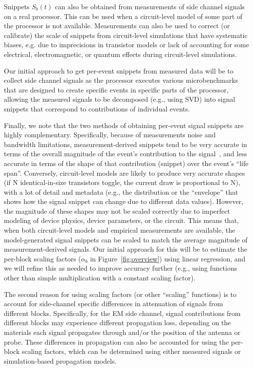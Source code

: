 Snippets $S_b(t)$ can also be obtained from measurements of side channel signals on a real processor. This can be used when a circuit-level model of some part of the processor is not available. Measurements can also be used to correct (or calibrate) the scale of snippets from circuit-level simulations that have systematic biases, e.g. due to imprecisions in transistor models or lack of accounting for some electrical, electromagnetic, or quantum effects during circuit-level simulations.

Our initial approach to get per-event snippets from measured data will be to collect side channel signals as the processor executes various microbenchmarks that are designed to create specific events in specific parts of the processor, allowing the measured signals to be decomposed (e.g., using SVD) into signal snippets that correspond to contributions of individual events.

Finally, we note that the two methods of obtaining per-event signal snippets are highly complementary. Specifically, because of measurements noise and bandwidth limitations, measurement-derived snippets tend to be very accurate in terms of the overall magnitude of the event's contribution to the signal~\cite{Callan:2014:PMM:2742155.2742179}, and less accurate in terms of the shape of that contribution (snippet) over the event's ``life span''. Conversely, circuit-level models are likely to produce very accurate shapes (if N identical-in-size transistors toggle, the current draw is proportional to N), with a lot of detail and metadata (e.g., the distribution or the ``envelope'' that shows how the signal snippet can change due to different data values). However, the magnitude of these shapes may not be scaled correctly due to imperfect modeling of device physics, device parameters, or the circuit. This means that, when both circuit-level models and empirical measurements are available, the model-generated signal snippets can be scaled to match the average magnitude of measurement-derived signals. Our initial approach for this will be to estimate the per-block scaling factors ($\alpha_b$ in Figure~\ref{fig:overview}) using linear regression, and we will refine this as needed to improve accuracy further (e.g., using functions other than simple multiplication with a constant scaling factor).

The second reason for using scaling factors (or other ``scaling'' functions) is to account for side-channel specific differences in attenuation of signals from different blocks. Specifically, for the EM side channel, signal contributions from different blocks may experience different propagation loss, depending on the materials each signal propagates through and/or the position of the antenna or probe. These differences in propagation can also be accounted for using the per-block scaling factors, which can be determined using either measured signals or simulation-based propagation models.

